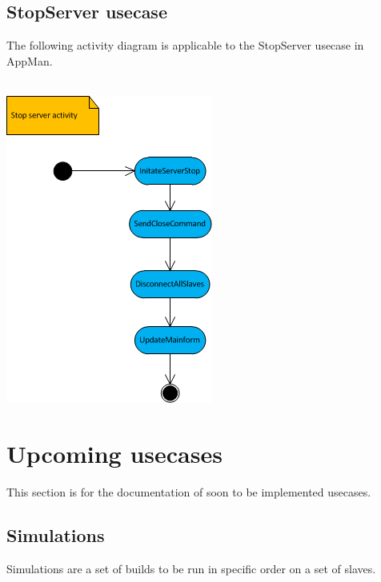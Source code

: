 \documentclass[a4paper,12pt,final]{article}
\begin{document}
\subsection{StopServer usecase}
The following activity diagram is applicable to the StopServer usecase in AppMan.\\
\textbf{\\}
\begin{center}
\includegraphics[scale=1]{StopServer.png}
\end{center}










\newpage
\section{Upcoming usecases}
This section is for the documentation of soon to be implemented usecases.


\subsection{Simulations}
Simulations are a set of builds to be run in specific order on a set of slaves.
\end{document}
